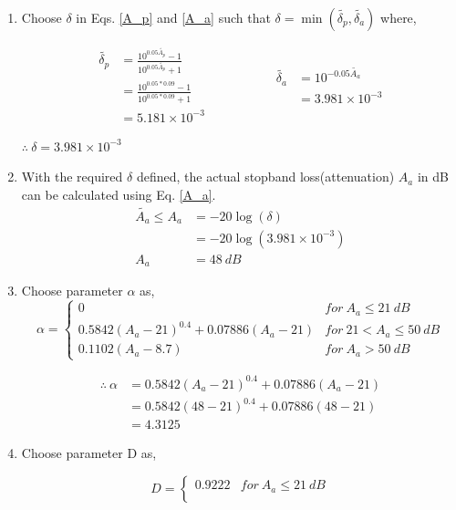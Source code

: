 \documentclass[a4paper,11pt]{article}%
\begin{document}
\begin{enumerate}[\hspace{1cm}a.)]
\item Choose $\delta$ in Eqs. \eqref{A_p} and \eqref{A_a} such that $\delta = \min(\tilde{\delta_p}, \tilde{\delta_a})$ where,

\[
\begin{split}
	\tilde{\delta_p} &= \frac{10^{0.05\tilde{A_p}}-1}{10^{0.05\tilde{A_p}}+1}\\
	&=\frac{10^{0.05*0.09}-1}{10^{0.05*0.09}+1}\\
	&=5.181\times10^{-3}
\end{split}
\hspace{2cm}
\begin{split}
	\tilde{\delta_a} &= 10^{-0.05\tilde{A_a}}\\
&=3.981\times10^{-3}
\end{split}
\]
\begin{center}
	$\therefore~ \delta = 3.981\times10^{-3} $
\end{center}

\item With the required $\delta$ defined, the actual stopband loss(attenuation) $A_a$ in dB can be calculated using Eq. \ref{A_a}.
\[
\begin{split}
	 \tilde{A_a} \le A_a &= -20\log(\delta)\\
	 &=-20\log(3.981\times10^{-3})\\
	A_a &= 48 ~dB
\end{split}
\]

\item Choose parameter $\alpha$ as,
    \[
\alpha = \begin{cases}
	0 & for~  A_a \leq 21 ~dB \\
	0.5842(A_a - 21)^{0.4} + 0.07886(A_a - 21) & for ~ 21 < A_a \leq 50 ~dB \\
	0.1102(A_a - 8.7) & for~  A_a > 50 ~dB
\end{cases}
\]

\[
\begin{split}
\therefore~ \alpha &= 0.5842(A_a - 21)^{0.4} + 0.07886(A_a - 21)\\
&=	0.5842(48 - 21)^{0.4} + 0.07886(48 - 21)\\
&=4.3125
\end{split}
\]

\item Choose parameter D as,

\[
D = \begin{cases}
	0.9222 & for ~ A_a \leq 21 ~dB \\


\end{cases}\]
\end{enumerate}
\end{document}
